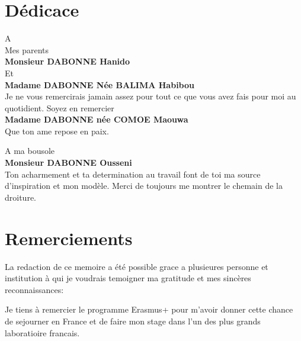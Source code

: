 {\begin{flushright}
\end{flushright}


\thispagestyle{front}
\chapter*{Dédicace}

\begin{flushright}
  A  \\
  Mes parents\\
  \textbf{Monsieur \textsc{DABONNE} Hanido}\\ Et  \\
  \textbf{Madame \textsc{DABONNE} Née BALIMA Habibou}\\
  \normalsize Je ne vous remercirais jamain assez pour tout ce que vous avez fais 
  pour moi au quotidient. Soyez en remercier\\
  \textbf{Madame \textsc{DABONNE} née \textsc{COMOE} Maouwa}\\
  \normalsize Que ton ame repose en paix. 


  A ma bousole  \\
  \textbf{Monsieur \textsc{DABONNE} Ousseni}\\
  \normalsize Ton acharmement et ta determination au travail font de toi ma source
   d'inspiration et mon modèle. Merci de toujours me montrer le chemain de la droiture.
\end{flushright}


\thispagestyle{front}

\chapter*{Remerciements}

La redaction de ce memoire a été possible grace a plusieures personne et institution à qui je voudrais 
temoigner ma gratitude et mes sincères reconnaissances:

  Je tiens à remercier le programme Erasmus+
  pour m'avoir donner cette chance de sejourner en France et de faire mon stage 
  dans l'un des plus grands laboratioire francais. 
  
}
